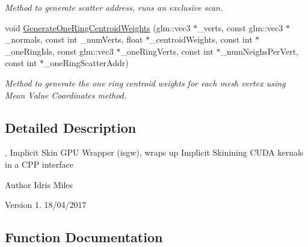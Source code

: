 \begin{DoxyCompactItemize}
\begin{DoxyCompactList}\small\item\em Method to generate scatter address, runs an exclusive scan. \end{DoxyCompactList}\item 
void \hyperlink{namespaceisgw_a89743f193a8a8203e343479029570309}{Generate\+One\+Ring\+Centroid\+Weights} (glm\+::vec3 $\ast$\+\_\+verts, const glm\+::vec3 $\ast$\+\_\+normals, const int \+\_\+num\+Verts, float $\ast$\+\_\+centroid\+Weights, const int $\ast$\+\_\+one\+Ring\+Ids, const glm\+::vec3 $\ast$\+\_\+one\+Ring\+Verts, const int $\ast$\+\_\+num\+Neighs\+Per\+Vert, const int $\ast$\+\_\+one\+Ring\+Scatter\+Addr)
\begin{DoxyCompactList}\small\item\em Method to generate the one ring centroid weights for each mesh vertex using Mean Value Coordinates method. \end{DoxyCompactList}\end{DoxyCompactItemize}


\subsection{Detailed Description}
, Implicit Skin G\+PU Wrapper (isgw), wraps up Implicit Skinining C\+U\+DA kernals in a C\+PP interface 

\begin{DoxyAuthor}{Author}
Idris Miles 
\end{DoxyAuthor}
\begin{DoxyVersion}{Version}
1.  18/04/2017 
\end{DoxyVersion}


\subsection{Function Documentation}
